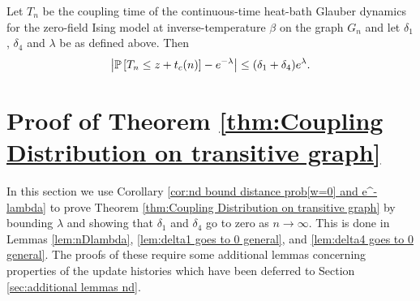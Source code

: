 
	\begin{corollary}
		\label{cor:nd bound distance prob[w=0] and e^-lambda}
		Let $T_n$ be the coupling time of the continuous-time heat-bath Glauber dynamics for the zero-field Ising model at inverse-temperature $\beta$ on the graph $G_n$ and let $\delta_1$, $\delta_4$ and $\lambda$ be as defined above. Then
		\begin{equation}
			\left|\mathbb{P}\left[T_n \leq z + t_c(n)\right] - e^{-\lambda}\right| \leq (\delta_1 + \delta_4)e^\lambda.
			\label{eq:nd bound distance prob[w=0] and e^-lambda}
		\end{equation}
	\end{corollary}

\section{Proof of Theorem \ref{thm:Coupling Distribution on transitive graph}}
\label{sec:proof thm coupling nd}
	In this section we use Corollary \ref{cor:nd bound distance prob[w=0] and e^-lambda} to prove Theorem \ref{thm:Coupling Distribution on transitive graph} by bounding $\lambda$ and showing that $\delta_1$ and $\delta_4$ go to zero as $n \rightarrow \infty$. This is done in Lemmas \ref{lem:nDlambda}, \ref{lem:delta1 goes to 0 general}, and \ref{lem:delta4 goes to 0 general}. The proofs of these require some additional lemmas concerning properties of the update histories which have been deferred to Section \ref{sec:additional lemmas nd}.

